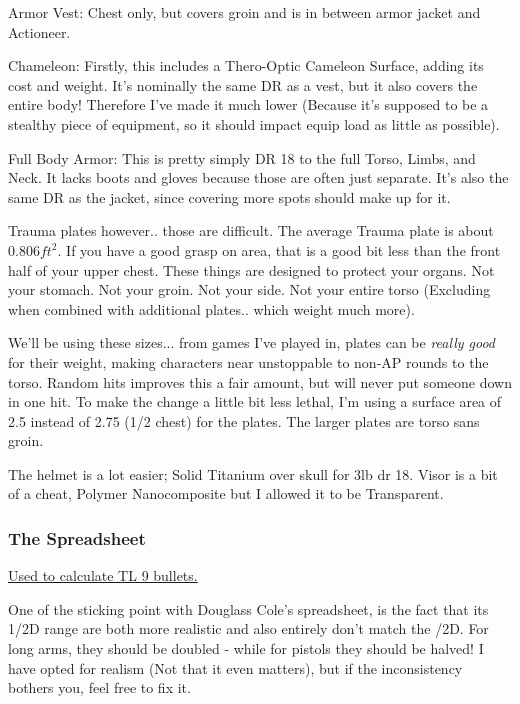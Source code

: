 \begin{multicols*}{2}
	Armor Vest: Chest only, but covers groin and is in between armor jacket and Actioneer.
	
	Chameleon: Firstly, this includes a Thero-Optic Cameleon Surface, adding its cost and weight. It's nominally the same DR as a vest, but it also covers the entire body! Therefore I've made it much lower (Because it's supposed to be a stealthy piece of equipment, so it should impact equip load as little as possible).
	
	Full Body Armor: This is pretty simply DR 18 to the full Torso, Limbs, and Neck. It lacks boots and gloves because those are often just separate. It's also the same DR as the jacket, since covering more spots should make up for it.
	
	Trauma plates however.. those are difficult. The average Trauma plate is about \(0.806 ft^2\). If you have a good grasp on area, that is a good bit less than the front half of your upper chest. These things are designed to protect your organs. Not your stomach. Not your groin. Not your side. Not your entire torso (Excluding when combined with additional plates.. which weight much more).
	
	We'll be using these sizes... from games I've played in, plates can be \textit{really good} for their weight, making characters near unstoppable to non-AP rounds to the torso. Random hits improves this a fair amount, but will never put someone down in one hit. To make the change a little bit less lethal, I'm using a surface area of 2.5 instead of 2.75 (1/2 chest) for the plates. The larger plates are torso sans groin.
	
	The helmet is a lot easier; Solid Titanium over skull for 3lb dr 18. Visor is a bit of a cheat, Polymer Nanocomposite but I allowed it to be Transparent.
	
	
	\subsubsection{The Spreadsheet}
	
	\textcolor{Blue}{\href{http://forums.sjgames.com/showpost.php?p=2124462&postcount=37}{Used to calculate TL 9 bullets.}}
	
	One of the sticking point with Douglass Cole's spreadsheet, is the fact that its 1/2D range are both more realistic and also entirely don't match the /2D. For long arms, they should be doubled - while for pistols they should be halved! I have opted for realism (Not that it even matters), but if the inconsistency bothers you, feel free to fix it.
	

\end{multicols*}
